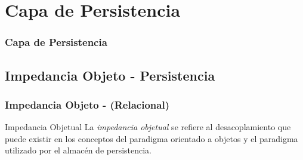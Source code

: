 \documentclass[a4paper,slidestop,xcolor=pst,dvips,blue]{beamer}
\begin{document}
\section{Capa de Persistencia}

\begin{frame}
    \frametitle{Capa de Persistencia}
\end{frame}

\subsection{Impedancia Objeto - Persistencia}

\begin{frame}[c]
    \frametitle{Impedancia Objeto - (Relacional)}
    \begin{block}{Impedancia Objetual}
    La \emph{impedancia objetual} se refiere al desacoplamiento que puede existir en los conceptos del paradigma orientado a objetos y el paradigma utilizado por el almacén de persistencia.
    \end{block}
\end{frame}
\end{document}

